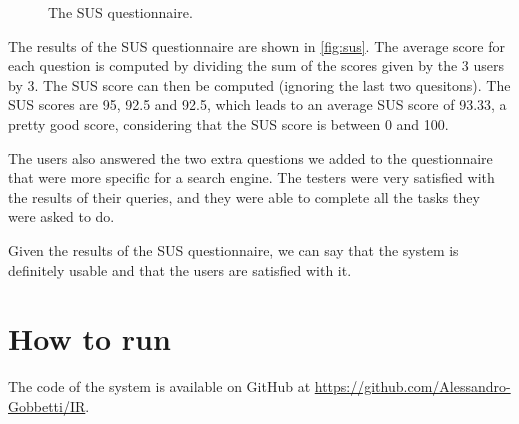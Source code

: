\documentclass[tikz,14pt]{article}
\begin{document}




\begin{figure}
    \caption{The SUS questionnaire.}
    \label{fig:sus}
\end{figure}

The results of the SUS questionnaire are shown in \autoref{fig:sus}.
The average score for each question is computed by dividing the sum of the scores given by the 3 users by 3.
The SUS score can then be computed (ignoring the last two quesitons). 
The SUS scores are 95, 92.5 and 92.5, which leads to an average SUS score of 93.33, a pretty good score, considering that the SUS score is between 0 and 100.

The users also answered the two extra questions we added to the questionnaire that were more specific for a search engine.
The testers were very satisfied with the results of their queries, and they were able to complete all the tasks they were asked to do.

Given the results of the SUS questionnaire, we can say that the system is definitely usable and that the users are satisfied with it.


\section{How to run} \label{sec:howtorun}
The code of the system is available on GitHub at \url{https://github.com/Alessandro-Gobbetti/IR}.
\end{document}
